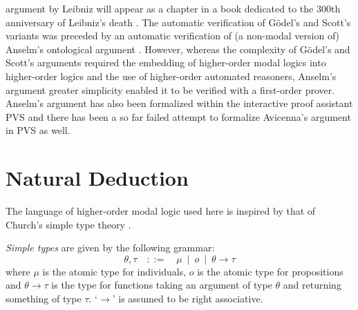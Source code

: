 \documentclass[smallextended]{svjour3}
\newcommand{\imp}{\rightarrow}
\begin{document}
argument by Leibniz will appear as a chapter in a book dedicated to
the 300th anniversary of Leibniz's death
\citep{LeibnizOntologicalProof}. The automatic verification of G\"odel's
and Scott's variants \citep{ECAI2014} was preceded by an automatic
verification of (a non-modal version of) Anselm's ontological argument
\citep{ZaltaOppenheimer}. However, whereas the complexity of G\"odel's
and Scott's arguments required the embedding of higher-order modal
logics into higher-order logics and the use of higher-order automated
reasoners, Anselm's argument greater simplicity enabled it to be
verified with a first-order prover. Anselm's argument has also been
formalized within the interactive proof assistant PVS \citep{Rushby}
and there has been a so far failed attempt to formalize Avicenna's
argument in PVS as well.





\section{Natural Deduction}
\label{sec:calculus}

The language of higher-order modal logic used here is inspired by that of Church's simple type theory \citep{church}.

\begin{definition} \emph{Simple types} are given by the following grammar:
$$
  \theta,\tau \quad ::= \quad \mu \ \mid \ o \ \mid \ \theta \imp \tau
$$
where $\mu$ is the atomic type for individuals, $o$ is the atomic type for propositions and $\theta \imp \tau$ is the type for functions taking an argument of type $\theta$ and returning something of type $\tau$. `$\imp$' is assumed to be right associative.
\end{definition}
\end{document}
